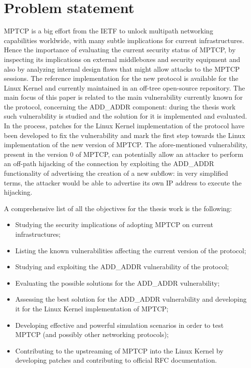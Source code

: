 \section{Problem statement}
MPTCP is a big effort from the IETF to unlock multipath networking capabilities worldwide, with many subtle implications for current infrastructures. Hence the importance of evaluating the current security status of MPTCP, by inspecting its implications on external middleboxes and security equipment and also by analyzing internal design flaws that might allow attacks to the MPTCP sessions.
The reference implementation for the new protocol is available for the Linux Kernel and currently maintained in an off-tree open-source repository.
The main focus of this paper is related to the main vulnerability currently known for the protocol, concerning the ADD\_ADDR component: during the thesis work such vulnerability is studied and the solution for it is implemented and evaluated. In the process, patches for the Linux Kernel implementation of the protocol have been developed to fix the vulnerability and mark the first step towards the Linux implementation of the new version of MPTCP. The afore-mentioned vulnerability, present in the version 0 of MPTCP, can potentially allow an attacker to perform an off-path hijacking of the connection by exploiting the ADD\_ADDR functionality of advertising the creation of a new subflow: in very simplified terms, the attacker would be able to advertise its own IP address to execute the hijacking.

A comprehensive list of all the objectives for the thesis work is the following:
\begin{itemize}
    \item Studying the security implications of adopting MPTCP on current infrastructures;
    \item Listing the known vulnerabilities affecting the current version of the protocol;
    \item Studying and exploiting the ADD\_ADDR vulnerability of the protocol;
    \item Evaluating the possible solutions for the ADD\_ADDR vulnerability;
    \item Assessing the best solution for the ADD\_ADDR vulnerability and developing it for the Linux Kernel implementation of MPTCP;
    \item Developing effective and powerful simulation scenarios in order to test MPTCP (and possibly other networking protocols);
    \item Contributing to the upstreaming of MPTCP into the Linux Kernel by developing patches and contributing to official RFC documentation.
\end{itemize}

